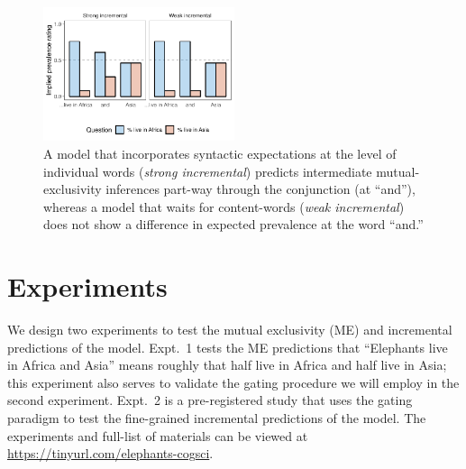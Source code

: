 \documentclass[10pt,letterpaper]{article}
\providecommand{\tightlist}{%
  \setlength{\itemsep}{0pt}\setlength{\parskip}{0pt}}
\newcommand{\denote}[1]{\mbox{ $[\![ #1 ]\!]$}}
\begin{document}
\begin{figure}[t]
  \centering
    \includegraphics[width=0.5\textwidth]{incremental}
    \vspace{-1cm}
  \caption{A model that incorporates syntactic expectations at the level of individual words (\emph{strong incremental}) predicts intermediate mutual-exclusivity inferences part-way through the conjunction (at ``and''), whereas a model that waits for content-words (\emph{weak incremental}) does not show a difference in expected prevalence at the word ``and.''
  }
          \vspace{-0.5cm}
  \label{fig:incremental}
\end{figure}


%


\section{Experiments}

We design two experiments to test the mutual exclusivity (ME) and incremental predictions of the model. 
Expt.~1 tests the ME predictions that ``Elephants live in Africa and Asia'' means roughly that half live in Africa and half live in Asia; this experiment also serves to validate the gating procedure we will employ in the second experiment. 
Expt.~2 is a pre-registered study that uses the gating paradigm to test the fine-grained incremental predictions of the model.
The experiments and full-list of materials can be viewed at \url{https://tinyurl.com/elephants-cogsci}.
\end{document}
